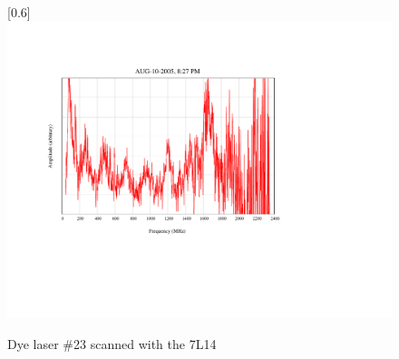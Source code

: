 \begin{figure}
\scalebox{0.8}[0.6]{
\includegraphics[viewport=150 200 300 450, bb=85 160 300 550]
{23-14/23-14.pdf}
}
\caption{Dye laser \#23 scanned with the 7L14}
\label{23-14}
\end{figure}
